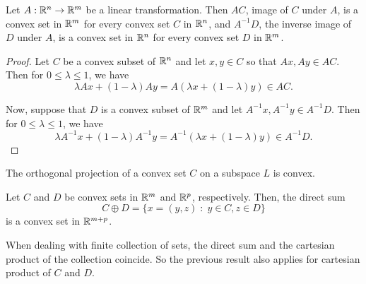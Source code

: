 \documentclass[11pt,a4paper]{article}
\begin{document}
\begin{theorem}\label{thm:convex_set_under_linear_transformation}
    Let $A:\mathbb{R}^n\rightarrow \mathbb{R}^m$ be a linear transformation. Then $AC$, image of $C$ under $A$, is a convex set in $\mathbb{R}^m$ for every convex set $C$ in $\mathbb{R}^n$, and $A^{-1}D$, the inverse image of $D$ under $A$, is a convex set in $\mathbb{R}^n$ for every convex set $D$ in $\mathbb{R}^m$.
\end{theorem}

\begin{proof}
    Let $C$ be a convex subset of $\mathbb{R}^n$ and let $x,y\in C$ so that $Ax,Ay\in AC$. Then for $0\le \lambda \le 1$, we have 
    \begin{equation*}
        \lambda Ax + (1-\lambda) A y = A(\lambda x+(1-\lambda)y) \in AC.
    \end{equation*}

    \noindent Now, suppose that $D$ is a convex subset of $\mathbb{R}^m$ and let $A^{-1}x,A^{-1}y\in A^{-1}D$. Then for $0\le \lambda\le 1$, we have
    \begin{equation*}
        \lambda A^{-1}x + (1-\lambda)A^{-1}y = A^{-1}(\lambda x + (1-\lambda) y) \in A^{-1}D.
    \end{equation*}
\end{proof}

\begin{corollary}
    The orthogonal projection of a convex set $C$ on a subspace $L$ is convex.
\end{corollary}


\begin{theorem}\label{thm:direct_sum_convex}
    Let $C$ and $D$ be convex sets in $\mathbb{R}^m$ and $\mathbb{R}^p$, respectively. Then, the direct sum
    \begin{equation*}
        C\oplus D = \{x = (y,z)\;:\; y\in C, z\in D\}
    \end{equation*}
    is a convex set in $\mathbb{R}^{m+p}$.
\end{theorem}

\begin{remark}
    When dealing with finite collection of sets, the direct sum and the cartesian product of the collection coincide. So the previous result also applies for cartesian product of $C$ and $D$.
\end{remark}
\end{document}

